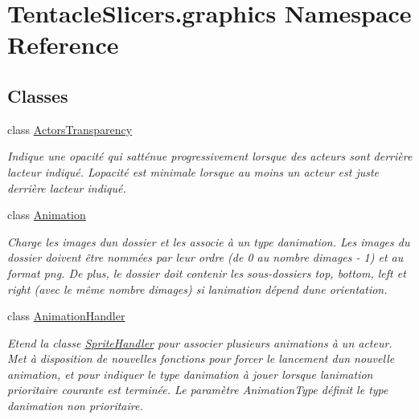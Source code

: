 \hypertarget{namespace_tentacle_slicers_1_1graphics}{}\section{Tentacle\+Slicers.\+graphics Namespace Reference}
\label{namespace_tentacle_slicers_1_1graphics}
\subsection*{Classes}
\begin{DoxyCompactItemize}
\item 
class \hyperlink{class_tentacle_slicers_1_1graphics_1_1_actors_transparency}{Actors\+Transparency}
\begin{DoxyCompactList}\small\item\em Indique une opacité qui s\textquotesingle{}atténue progressivement lorsque des acteurs sont derrière l\textquotesingle{}acteur indiqué. L\textquotesingle{}opacité est minimale lorsque au moins un acteur est juste derrière l\textquotesingle{}acteur indiqué. \end{DoxyCompactList}\item 
class \hyperlink{class_tentacle_slicers_1_1graphics_1_1_animation}{Animation}
\begin{DoxyCompactList}\small\item\em Charge les images d\textquotesingle{}un dossier et les associe à un type d\textquotesingle{}animation. Les images du dossier doivent être nommées par leur ordre (de 0 au nombre d\textquotesingle{}images -\/ 1) et au format png. De plus, le dossier doit contenir les sous-\/dossiers top, bottom, left et right (avec le même nombre d\textquotesingle{}images) si l\textquotesingle{}animation dépend d\textquotesingle{}une orientation. \end{DoxyCompactList}\item 
class \hyperlink{class_tentacle_slicers_1_1graphics_1_1_animation_handler}{Animation\+Handler}
\begin{DoxyCompactList}\small\item\em Etend la classe \hyperlink{class_tentacle_slicers_1_1graphics_1_1_sprite_handler}{Sprite\+Handler} pour associer plusieurs animations à un acteur. Met à disposition de nouvelles fonctions pour forcer le lancement d\textquotesingle{}un nouvelle animation, et pour indiquer le type d\textquotesingle{}animation à jouer lorsque l\textquotesingle{}animation prioritaire courante est terminée. Le paramètre Animation\+Type définit le type d\textquotesingle{}animation non prioritaire. \end{DoxyCompactList}\item 

\end{DoxyCompactItemize}
